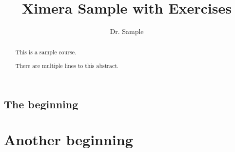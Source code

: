 \documentclass{xourse}
\title{Ximera Sample with Exercises}
\author{Dr. Sample}
\begin{document}
\begin{abstract}
  This is a sample course.

  There are multiple lines to this abstract.
\end{abstract}
\maketitle

\begin{graded}{50}
\part{The beginning}
\begin{graded}{20}
  \chapterstyle
  \sectionstyle
\end{graded}
\begin{graded}{10}
\end{graded}
\end{graded}

\part{Another beginning}
\begin{graded}{50}
  \chapterstyle
  \sectionstyle
\end{graded}
\end{document}
